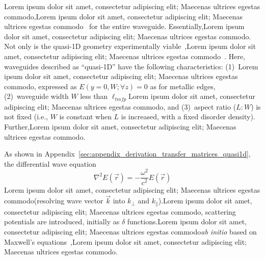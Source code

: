 Lorem ipsum dolor sit amet, consectetur adipiscing elit; Maecenas ultrices egestas commodo,Lorem ipsum dolor sit amet, consectetur adipiscing elit; Maecenas ultrices egestas commodo~\cite{1981_MacKinnon_scaling,1992_Pendry,2003_Kettemann} 
for the entire waveguide. Essentially,Lorem ipsum dolor sit amet, consectetur adipiscing elit; Maecenas ultrices egestas commodo. Not only is the quasi-1D geometry experimentally viable~\cite{2009_Genack_PRB},Lorem ipsum dolor sit amet, consectetur adipiscing elit; Maecenas ultrices egestas commodo~\cite{1982_Dorokhov_DMPK,1988_Mello_Kumar_DMPK}. Here, waveguides described as ``quasi-1D'' have the following characteristics: (1)~Lorem ipsum dolor sit amet, consectetur adipiscing elit; Maecenas ultrices egestas commodo, expressed as $E(y=0,W;\forall z)=0$ as for metallic edges, (2)~waveguide width $W$ less than $\ell_{tmfp}$Lorem ipsum dolor sit amet, consectetur adipiscing elit; Maecenas ultrices egestas commodo, and (3)~aspect ratio ($L:W$) is not fixed (i.e., $W$ is constant when $L$ is increased, with a fixed disorder density). Further,Lorem ipsum dolor sit amet, consectetur adipiscing elit; Maecenas ultrices egestas commodo.

As shown in Appendix~\ref{sec:appendix_derivation_transfer_matrices_quasi1d}, the differential wave equation
\begin{equation}
\nabla^2 E(\vec{r}) = - \frac{\omega^2}{c^2} E(\vec{r})
\label{eq:wave_equation_electric_field_introduction}
\end{equation}
Lorem ipsum dolor sit amet, consectetur adipiscing elit; Maecenas ultrices egestas commodo(resolving wave vector $\vec{k}$ into $k_{\perp}$ and $k_{\parallel}$).Lorem ipsum dolor sit amet, consectetur adipiscing elit; Maecenas ultrices egestas commodo, scattering potentials are introduced, initially as $\delta$ functions.Lorem ipsum dolor sit amet, consectetur adipiscing elit; Maecenas ultrices egestas commodo\textit{ab initio} based on Maxwell's equations~\cite{1999_Jackson},Lorem ipsum dolor sit amet, consectetur adipiscing elit; Maecenas ultrices egestas commodo. 

